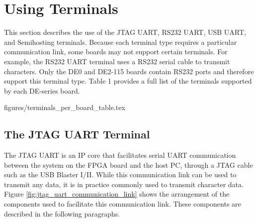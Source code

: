 \documentclass[11pt, twoside, pdftex]{article}
\begin{document}




\section{Using Terminals}

This section describes the use of the JTAG UART, RS232 UART, USB UART, and Semihosting terminals. Because each terminal type requires a particular communication link, some boards may not support certain terminals. For example, the RS232 UART terminal uses a RS232 serial cable to transmit characters. Only the DE0 and DE2-115 boards contain RS232 ports and therefore support this terminal type. Table 1 provides a full list of the terminals supported by each DE-series board. 

 {figures/terminals_per_board_table.tex}

\subsection{The JTAG UART Terminal}

The JTAG UART is an IP core that facilitates serial UART communication between the system
on the FPGA board and the host PC, through a JTAG cable such as the USB Blaster I/II. While this communication link can be used to transmit any data, it is in practice commonly used to transmit character data. Figure \ref{fig:jtag_uart_communication_link} shows the arrangement of the components used to facilitate this communication link. These components are described in the following paragraphs.
\end{document}
